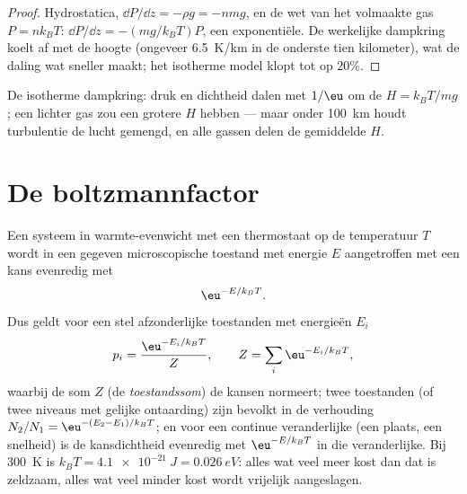 \begin{proof}
Hydrostatica, $\dd P/\dd z = -\rho g = -nmg$, en de wet van het volmaakte
gas $P
= nk_BT$: $\dd P/\dd z = -(mg/k_BT)P$, een exponentiële. De
werkelijke
dampkring koelt af met de hoogte (ongeveer \qty{6.5}{K/km} in de onderste tien
kilometer), wat de daling wat sneller maakt; het isotherme
model klopt tot op $20\%$.
\end{proof}

\begin{omfigure}

{\small De isotherme dampkring: druk en dichtheid dalen met $1/\eu$
om de  $H = k_BT/mg$; een lichter gas zou een grotere $H$ hebben
--- maar onder \qty{100}{km} houdt turbulentie de lucht gemengd, en alle
gassen delen de gemiddelde $H$.}
\end{omfigure}

\section{De boltzmannfactor}

\begin{theorem}[Boltzmannfactor]\label{thm:b2:boltzmann-factor:factor}
Een systeem in warmte-evenwicht met een thermostaat op de temperatuur
$T$ wordt in een gegeven microscopische toestand met energie $E$
aangetroffen met een
kans evenredig met
\[
\eu^{-E/k_BT} .
\]
Dus geldt voor een stel afzonderlijke toestanden met energieën $E_i$
\[
p_i = \frac{\eu^{-E_i/k_BT}}{Z}, \qquad Z = \sum_i\eu^{-E_i/k_BT} ,
\]
waarbij de som $Z$ (de \emph{toestandssom})
de kansen normeert; twee toestanden (of twee niveaus met gelijke
ontaarding) zijn bevolkt in de verhouding $N_2/N_1 = \eu^{-(E_2 - E_1)/k_BT}$;
en voor een continue veranderlijke (een plaats, een snelheid) is de kansdichtheid
evenredig met $\eu^{-E/k_BT}$ in die veranderlijke. Bij
\qty{300}{K} is $k_BT = \qty{4.1e-21}{J} = \qty{0.026}{eV}$: alles wat
veel meer kost dan dat is zeldzaam, alles wat veel minder kost wordt
vrijelijk aangeslagen.
\end{theorem}

